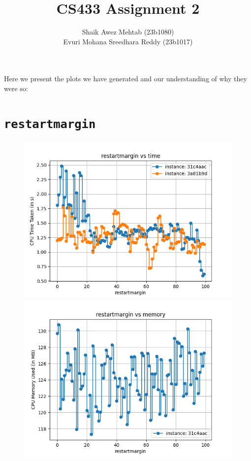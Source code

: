 \documentclass{article}
\title{CS433 Assignment 2}
\author{Shaik Awez Mehtab (23b1080)
        \\ Evuri Mohana Sreedhara Reddy (23b1017)}
\date{}
\begin{document}
    \maketitle
    Here we present the plots we have generated and our understanding of why
    they were so:
    \section*{\texttt{restartmargin}}
    \begin{figure}[H]
        \centering
        \begin{minipage}{0.45\textwidth}
            \centering
            \includegraphics[width = \linewidth]{restartmargin-0.png}
        \end{minipage}
        \hfill
        \begin{minipage}{0.45\textwidth}
            \centering
            \includegraphics[width = \linewidth]{restartmargin-1.png}
        \end{minipage}
    \end{figure}
\end{document}
